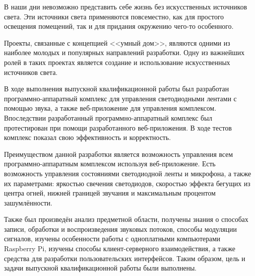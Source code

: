 \conclusion

В наши дни невозможно представить себе жизнь без искусственных источников света. Эти источники света применяются повсеместно, как для простого освещения помещений, так и для придания окружению чего-то особенного.

Проекты, связанные с концепцией <<умный дом>>, являются одними из наиболее молодых и популярных направлений разработки. Одну из важнейших ролей в таких проектах является создание и использование искусственных источников света.

В ходе выполнения выпускной квалификационной работы был разработан программно-аппаратный комплекс для управления светодиодными лентами с помощью звука, а также веб-приложение для управления комплексом. Впоследствии разработанный программно-аппаратный комплекс был протестирован при помощи разработанного веб-приложения. В ходе тестов комплекс показал свою эффективность и корректность.

Преимуществом данной разработки является возможность управления всем программно-аппаратным комплексом используя веб-приложение. Есть возможность управления состояниями светодиодной ленты и микрофона, а также их параметрами: яркостью свечения светодиодов, скоростью эффекта бегущих из центра огней, нижней границей звучания и максимальным процентом зашумлённости.

Также был произведён анализ предметной области, получены знания о способах записи, обработки и воспроизведения звуковых потоков, способы модуляции сигналов, изучены особенности работы с одноплатными компьютерами Raspberry Pi, изучены способы клиент-серверного взаимодействия, а также средства для разработки пользовательских интерфейсов. Таким образом, цель и задачи выпускной квалификационной работы были выполнены.


